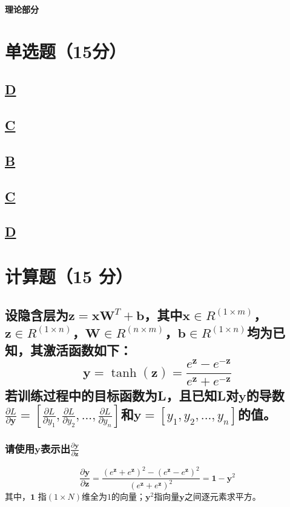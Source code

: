 \documentclass[a4paper]{article}
\begin{document}
\vspace{3mm}
\centerline{\textbf{\Large{理论部分}}}

\section{单选题（15分）}
\subsection{\underline{D}}

\subsection{\underline{C}}

\subsection{\underline{B}}

\subsection{\underline{C}}

\subsection{\underline{D}}

\section{计算题（15 分）}
\subsection{设隐含层为$\mathbf{z}=\mathbf{x}\mathbf{W}^T+\mathbf{b}$，其中$\mathbf{x}\in R^{(1 \times m)}$，$\mathbf{z}\in R^{(1\times n)}$，$\mathbf{W}\in R^{(n\times m)}$，$\mathbf{b} \in R^{(1\times n)}$均为已知，其激活函数如下：
$$\mathbf{y}=\tanh(\mathbf{z})=\frac{e^\mathbf{z}-e^{-\mathbf{z}}}{e^\mathbf{z}+e^{-\mathbf{z}}}$$
若训练过程中的目标函数为L，且已知L对$\mathbf{y}$的导数 $\frac{\partial L}{\partial \mathbf{y}}=[\frac{\partial L}{\partial y_1},\frac{\partial L}{\partial y_2},...,\frac{\partial L}{\partial y_n}]$和$\mathbf{y}=[y_1,y_2,...,y_n]$的值。}
\subsubsection{请使用$\mathbf{y}$表示出$\frac{\partial \mathbf{y}}{\partial \mathbf{z}}$}
\begin{equation}
    \frac{\partial \mathbf{y}}{\partial \mathbf{z}} = \frac{(e^{\mathbf{z}} + e^{\mathbf{z}})^2 - (e^{\mathbf{z}} - e^{\mathbf{z}})^2}{(e^{\mathbf{z}} + e^{\mathbf{z}})^2} = \mathbf{1} - \mathbf{y}^2
\end{equation}
其中，$ \mathbf{1} $ 指$ (1 \times N) $维全为$ 1 $的向量；$ \mathbf{y}^2 $指向量$ \mathbf{y} $之间逐元素求平方。
\end{document}
